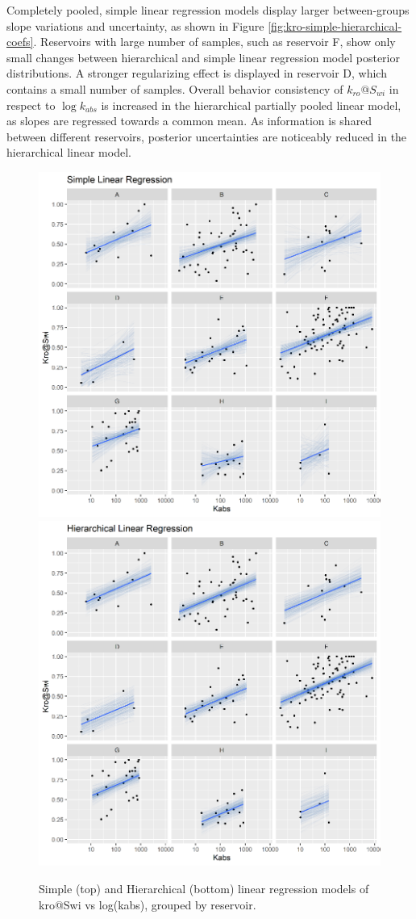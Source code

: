 \documentclass[english,msc,numbers]{coppe}
\begin{document}
  Completely pooled, simple linear regression models display larger between-groups slope variations and uncertainty, as shown in Figure \ref{fig:kro-simple-hierarchical-coefs}. Reservoirs with large number of samples, such as reservoir F, show only small changes between hierarchical and simple linear regression model posterior distributions. A stronger regularizing effect is displayed in reservoir D, which contains a small number of samples. Overall behavior consistency of \(k_{ro}@S_{wi}\) in respect to \(\log{k_{abs}}\) is increased in the hierarchical partially pooled linear model, as slopes are regressed towards a common mean. As information is shared between different reservoirs, posterior uncertainties are noticeably reduced in the hierarchical linear model.
  \begin{figure}
  
  {\centering \includegraphics[width=0.75\linewidth]{figure/4-12-kro-simple} \includegraphics[width=0.75\linewidth]{figure/4-12-kro-hierarchical} 
  
  }
  
  \caption{Simple (top) and Hierarchical (bottom) linear regression models of kro@Swi vs log(kabs), grouped by reservoir.}\label{fig:kro-simple-hierarchical}
  \end{figure}
\end{document}

